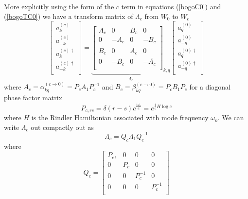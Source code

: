 \documentclass[12pt,a4paper]{article}
\begin{document}
More explicitly using the form of the $c$ term in equations (\ref{bogoC0}) and (\ref{bogoTC0}) we have a transform matrix of $\Lambda_c$ from $W_0$ to $W_c$ 
\begin{equation}
  \left[ \begin{array}{l}
    a^{(c)}_k \\
    a^{(c)}_{-k} \\
    \hline 
    a^{(c)\dagger}_k \\
    a^{(c)\dagger}_{-k} \\
 \end{array} \right] = \underbrace{
  \left[
\begin{array}{rr|rr}
    A_c        &       0   &  B_c            &  0 \\
    0        &      -A_c   &  0            & -B_c \\
    \hline 
    \overline{B_c}        &    0      &  \overline{A_c} & 0 \\
    0 &    -\overline{B_c}      &   0           & -\overline{A_c} \\
\end{array} \right]_{k,q} }_{\Lambda_c}
  \left[ \begin{array}{l}
    a^{(0)}_q \\
    a^{(0)}_{-q} \\
    \hline
    a^{(0)\dagger}_q \\
    a^{(0)\dagger}_{-q} \\
 \end{array} \right]
\end{equation}
where $A_c = \alpha_{kq}^{(c \rightarrow 0)} = P_c A_1 P_c^{-1}$  and $B_c = \beta_{kq}^{(c \rightarrow 0)} = P_c B_1 P_c$ for a diagonal phase factor matrix
\begin{equation}
  P_{c,rs} = \delta(r - s) c^{\frac{i\omega_r}{a}} = e^{\frac{i}{a} H \log c}
\end{equation}
where $H$ is the Rindler Hamiltonian associated with mode frequency $\omega_k$. We can write $\Lambda_c$ out compactly out as
\begin{equation}
  \Lambda_c = Q_c \Lambda_1 Q_c^{-1}
\end{equation}
where
\begin{equation}
  Q_c = \left[\begin{array}{cccc}
        P_c, & 0 & 0 & 0 \\
        0 & P_c & 0 & 0 \\
        0 & 0 & P_c^{-1} & 0 \\
        0 & 0 & 0 & P_c^{-1} \\
    \end{array} \right] 
\end{equation}
\end{document}
